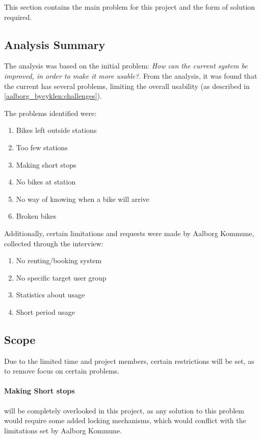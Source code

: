 This section contains the main problem for this project and the form of solution required.

\subsection{Analysis Summary}
The analysis was based on the initial problem: \textit{How can the current \citybike system be improved, in order to make it more usable?}.
From the analysis, it was found that the current \citybike has several problems, limiting the overall usability (as described in \cref{aalborg_bycyklen:challenges}).

The problems identified were:
\begin{enumerate}
\item Bikes left outside stations
\item Too few stations
\item Making short stops
\item No bikes at station
\item No way of knowing when a bike will arrive
\item Broken bikes
\end{enumerate}

Additionally, certain limitations and requests were made by Aalborg Kommune, collected through the interview:

\begin{enumerate}
\item No renting/booking system
\item No specific target user group
\item Statistics about usage
\item Short period usage
\end{enumerate}

\subsection{Scope}
Due to the limited time and project members, certain restrictions will be set, as to remove focus on certain problems.

\paragraph{Making Short stops} will be completely overlooked in this project, as any solution to this problem would require some added locking mechanisms, which would conflict with the limitations set by Aalborg Kommune.

